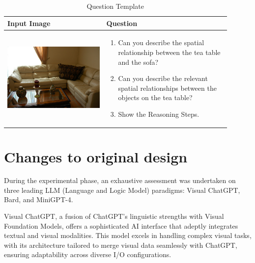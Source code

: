 \documentclass[twocolumn,11pt]{report}
\begin{document}
\begin{table}[ht]
    \centering
    \caption{Question Template}
    \label{tab:question_template}
    \begin{tabular}{|p{0.4\linewidth}|p{0.5\linewidth}|}
        \hline
        \textbf{Input Image} &\textbf{Question}\\
        \hline
        \begin{center} \includegraphics[width=\linewidth]{./pic/000000573553.jpg} \end{center}
        & \begin{enumerate}
            \item Can you describe the spatial relationship between the tea table and the sofa?
            \item Can you describe the relevant spatial relationships between the objects on the tea table?
            \item Show the Reasoning Steps.
        \end{enumerate}\\
        \hline
        \end{tabular}
\end{table}


\section{Changes to original design}
During the experimental phase, an exhaustive assessment was undertaken on three leading LLM (Language and Logic Model) paradigms: Visual ChatGPT\cite{wu2023visual}, Bard, and MiniGPT-4\cite{zhu2023minigpt4}.

Visual ChatGPT, a fusion of ChatGPT's linguistic strengths with Visual Foundation Models, offers a sophisticated AI interface that adeptly integrates textual and visual modalities. This model excels in handling complex visual tasks, with its architecture tailored to merge visual data seamlessly with ChatGPT, ensuring adaptability across diverse I/O configurations\cite{wu2023visual}.
\end{document}
